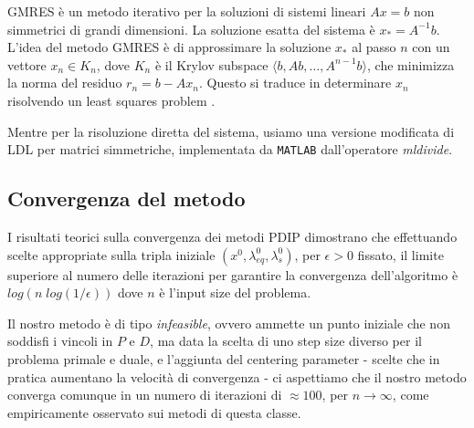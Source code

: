 GMRES è un metodo iterativo per la soluzioni di sistemi lineari $Ax=b$ non simmetrici di grandi dimensioni.
La soluzione esatta del sistema è $x_\ast = A^{-1}b$.
L'idea del metodo GMRES è di approssimare la soluzione $x_\ast$ al passo $n$ con un vettore $x_n \in K_n$, dove $K_n$ è il Krylov subspace $\langle b, Ab,\dots,A^{n-1}b\rangle$, che minimizza la norma del residuo $r_n = b - Ax_n$.
Questo si traduce in determinare $x_n$ risolvendo un least squares problem \cite{trefethen1997numerical}.

Mentre per la risoluzione diretta del sistema, usiamo una versione modificata di LDL per matrici simmetriche, implementata da \texttt{MATLAB} dall'operatore \textit{mldivide}.


\subsection{Convergenza del metodo}\label{cap:Convergenza}

I risultati teorici sulla convergenza dei metodi PDIP \cite{Nocedal2006Numerical} dimostrano che effettuando scelte appropriate sulla tripla iniziale $(x^0, \lambda_{eq}^0, \lambda_s^0)$, per $\epsilon > 0$ fissato, il limite superiore al numero delle iterazioni per garantire la convergenza dell'algoritmo è $log(n\; log(1/\epsilon))$ dove $n$ è l'input size del problema.

Il nostro metodo è di tipo \textit{infeasible}, 
ovvero ammette un punto iniziale che non soddisfi i vincoli in $P$ e $D$, ma data la scelta di uno step size diverso per il problema primale e duale, e l'aggiunta del centering parameter - scelte che in pratica aumentano la velocità di convergenza - ci aspettiamo che il nostro metodo converga comunque in un numero di iterazioni di $\approx 100$, per $n \rightarrow \infty$, come empiricamente osservato sui metodi di questa classe.

